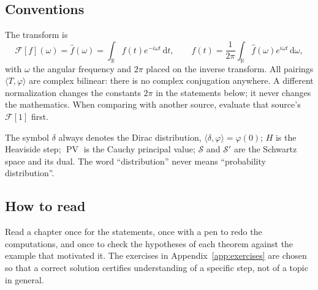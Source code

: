 \documentclass[11pt,openany,oneside]{book}
\theoremstyle{plain}
\theoremstyle{definition}
\theoremstyle{remark}
\numberwithin{equation}{chapter}
\newcommand{\F}{\mathcal{F}}
\newcommand{\R}{\mathbb{R}}
\newcommand{\Sw}{\mathcal{S}}
\newcommand{\dd}{\,\mathrm{d}}
\newcommand{\PV}{\operatorname{PV}}
\newcommand{\ip}[2]{\langle #1,#2\rangle}
\newcommand{\fh}{\widehat{f}}
\begin{document}
\subsection*{Conventions}

The transform is
\begin{equation}
\F[f](\omega)=\fh(\omega)=\int_{\R}f(t)e^{-i\omega t}\dd t,
\qquad
f(t)=\frac{1}{2\pi}\int_{\R}\fh(\omega)e^{i\omega t}\dd\omega ,
\end{equation}
with $\omega$ the angular frequency and $2\pi$ placed on the inverse transform. All pairings
$\ip{T}{\varphi}$ are complex bilinear: there is no complex conjugation anywhere. A different
normalization changes the constants $2\pi$ in the statements below; it never changes the
mathematics. When comparing with another source, evaluate that source's $\F[1]$ first.

The symbol $\delta$ always denotes the Dirac distribution, $\ip{\delta}{\varphi}=\varphi(0)$;
$H$ is the Heaviside step; $\PV$ is the Cauchy principal value; $\Sw$ and $\Sw'$ are the Schwartz
space and its dual. The word ``distribution'' never means ``probability distribution''.

\subsection*{How to read}

Read a chapter once for the statements, once with a pen to redo the computations, and once to
check the hypotheses of each theorem against the example that motivated it. The exercises in
Appendix~\ref{app:exercises} are chosen so that a correct solution certifies understanding of a
specific step, not of a topic in general.

\begingroup\small\tableofcontents\endgroup

\mainmatter









\end{document}
